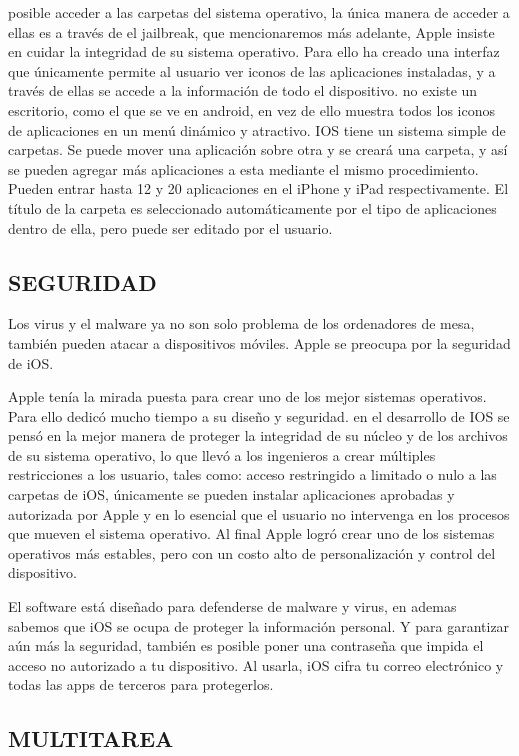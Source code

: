 posible acceder a las carpetas del sistema operativo, la única
manera de acceder a ellas es a través de el jailbreak, que
mencionaremos más adelante, Apple insiste en cuidar la
integridad de su sistema operativo. Para ello ha creado una
interfaz que únicamente permite al usuario ver iconos de las
aplicaciones instaladas, y a través de ellas se accede a la
información de todo el dispositivo. no existe un escritorio, como
el que se ve en android, en vez de ello muestra todos los iconos
de aplicaciones en un menú dinámico y atractivo.
IOS tiene un sistema simple de carpetas. Se puede mover una
aplicación sobre otra y se creará una carpeta, y así se pueden
agregar más aplicaciones a esta mediante el mismo
procedimiento. Pueden entrar hasta 12 y 20 aplicaciones en el
iPhone y iPad respectivamente. El título de la carpeta es
seleccionado automáticamente por el tipo de aplicaciones dentro
de ella, pero puede ser editado por el usuario.

\subsection*{SEGURIDAD}

Los virus y el malware ya no son solo problema de los
ordenadores de mesa, también pueden atacar a dispositivos
móviles. Apple se preocupa por la seguridad de iOS.

Apple tenía la mirada puesta para crear uno de los mejor
sistemas operativos. Para ello dedicó mucho tiempo a su diseño
y seguridad. en el desarrollo de IOS se pensó en la mejor
manera de proteger la integridad de su núcleo y de los archivos
de su sistema operativo, lo que llevó a los ingenieros a crear
múltiples restricciones a los usuario, tales como: acceso
restringido a limitado o nulo a las carpetas de iOS, únicamente
se pueden instalar aplicaciones aprobadas y autorizada por
Apple y en lo esencial que el usuario no intervenga en los
procesos que mueven el sistema operativo. Al final Apple logró
crear uno de los sistemas operativos más estables, pero con un
costo alto de personalización y control del dispositivo.

El software está diseñado para defenderse de malware y virus,
en ademas sabemos que iOS se ocupa de proteger la
información personal. Y para garantizar aún más la seguridad,
también es posible poner una contraseña que impida el acceso
no autorizado a tu dispositivo. Al usarla, iOS cifra tu correo
electrónico y todas las apps de terceros para protegerlos.


\subsection*{MULTITAREA}

